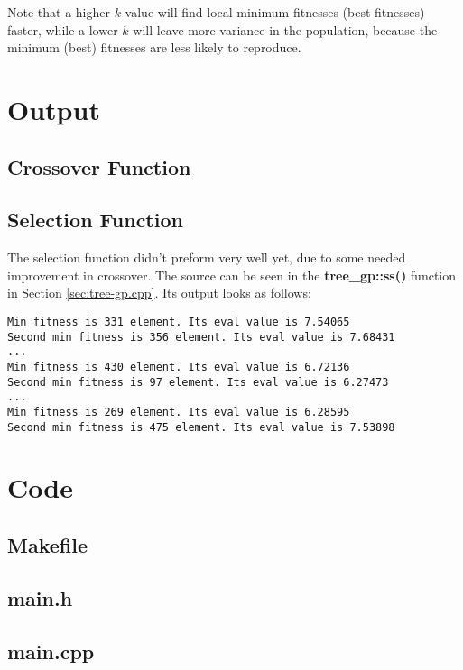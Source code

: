 \documentclass[12pt]{article}
\begin{document}
Note that a higher $ k $ value will find local minimum fitnesses (best fitnesses) faster, while a lower $ k $ will leave more variance in the population, because the minimum (best) fitnesses are less likely to reproduce. 

\section{Output}
\label{sec:output}

\subsection{Crossover Function}


\subsection{Selection Function}
The selection function didn't preform very well yet, due to some needed improvement in crossover. The source can be seen in the \textbf{tree\_gp::ss()} function in Section \ref{sec:tree-gp.cpp}. Its output looks as follows:
\begin{lstlisting}
Min fitness is 331 element. Its eval value is 7.54065
Second min fitness is 356 element. Its eval value is 7.68431
...
Min fitness is 430 element. Its eval value is 6.72136
Second min fitness is 97 element. Its eval value is 6.27473
...
Min fitness is 269 element. Its eval value is 6.28595
Second min fitness is 475 element. Its eval value is 7.53898
\end{lstlisting}


\pagebreak

\section{Code}
\footnotesize
\subsection{Makefile}


\subsection{main.h}


\subsection{main.cpp}

\end{document}
